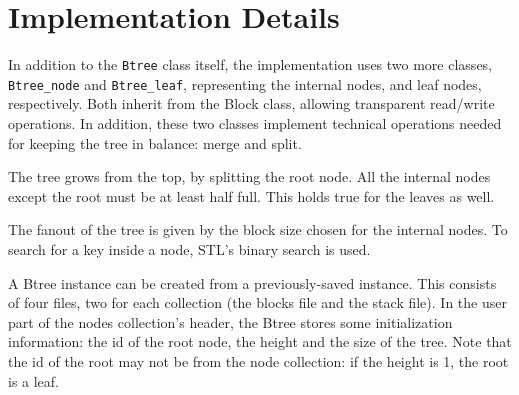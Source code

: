 \documentclass[11pt]{article}
\begin{document}
\section{Implementation Details}

In addition to the {\tt Btree} class itself, the implementation uses two
more classes, {\tt Btree\_node} and {\tt Btree\_leaf}, representing
the internal nodes, and leaf nodes, respectively. Both inherit from
the Block class, allowing transparent read/write operations. In
addition, these two classes implement technical operations needed for
keeping the tree in balance: merge and split. 

The tree grows from the top, by splitting the root node. All the
internal nodes except the root must be at least half full. This holds
true for the leaves as well.

The fanout of the tree is given by the block size chosen for the
internal nodes. To search for a key inside a node, STL's binary search
is used.

A Btree instance can be created from a previously-saved instance. This
consists of four files, two for each collection (the blocks file and
the stack file). In the user part of the nodes collection's header,
the Btree stores some initialization information: the id of the root
node, the height and the size of the tree. Note that the id of the
root may not be
from the node collection: if the height is 1, the root is a leaf.
\end{document}
